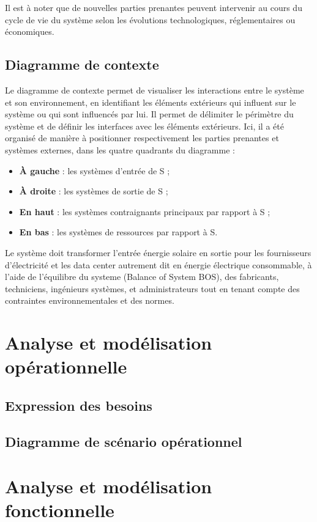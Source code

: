 \documentclass{article}
\begin{document}
Il est à noter que de nouvelles parties prenantes peuvent intervenir au cours du cycle de vie du système selon les évolutions technologiques, réglementaires ou économiques. 
\subsection{Diagramme de contexte} 

Le diagramme de contexte permet de visualiser les interactions entre le système et son environnement, en identifiant les éléments extérieurs qui influent sur le système ou qui sont influencés par lui. Il permet de délimiter le périmètre du système et de définir les interfaces avec les éléments extérieurs. Ici, il a été organisé de manière à positionner respectivement les parties prenantes et systèmes externes, dans les quatre quadrants du diagramme :
\begin{itemize}
    \item \textbf{À gauche} : les systèmes d'entrée de S ;
    \item \textbf{À droite} : les systèmes de sortie de S ;
    \item \textbf{En haut} : les systèmes contraignants principaux par rapport à S ;
    \item \textbf{En bas} : les systèmes de ressources par rapport à S.
\end{itemize}
Le système doit transformer l'entrée énergie solaire en sortie pour les fournisseurs d'électricité et les data center autrement dit en énergie électrique consommable, à l'aide de l'équilibre du systeme (Balance of System BOS), des fabricants, techniciens, ingénieurs systèmes, et administrateurs tout en tenant compte des contraintes environnementales et des normes.  



\section{Analyse et modélisation opérationnelle}
\subsection{Expression des besoins}

\subsection{Diagramme de scénario opérationnel}


\section{Analyse et modélisation fonctionnelle}
\end{document}
